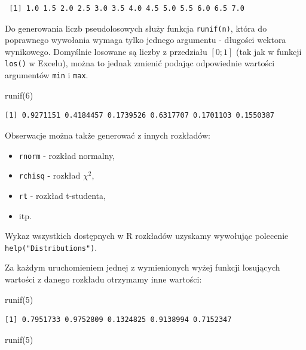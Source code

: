 \documentclass[
  letterpaper,
  DIV=11,
  numbers=noendperiod]{scrreprt}
\newenvironment{Shaded}{\begin{snugshade}}{\end{snugshade}}
\newcommand{\DecValTok}[1]{\textcolor[rgb]{0.68,0.00,0.00}{#1}}
\newcommand{\FunctionTok}[1]{\textcolor[rgb]{0.28,0.35,0.67}{#1}}
\newcommand{\NormalTok}[1]{\textcolor[rgb]{0.00,0.23,0.31}{#1}}
\providecommand{\tightlist}{%
  \setlength{\itemsep}{0pt}\setlength{\parskip}{0pt}}\usepackage{longtable,booktabs,array}
\begin{document}
\begin{verbatim}
 [1] 1.0 1.5 2.0 2.5 3.0 3.5 4.0 4.5 5.0 5.5 6.0 6.5 7.0
\end{verbatim}

Do generowania liczb pseudolosowych służy funkcja \texttt{runif(n)},
która do poprawnego wywołania wymaga tylko jednego argumentu - długości
wektora wynikowego. Domyślnie losowane są liczby z przedziału \([0;1]\)
(tak jak w funkcji \texttt{los()} w Excelu), można to jednak zmienić
podając odpowiednie wartości argumentów \texttt{min} i \texttt{max}.

\begin{Shaded}
\begin{Highlighting}[]
\FunctionTok{runif}\NormalTok{(}\DecValTok{6}\NormalTok{)}
\end{Highlighting}
\end{Shaded}

\begin{verbatim}
[1] 0.9271151 0.4184457 0.1739526 0.6317707 0.1701103 0.1550387
\end{verbatim}

Obserwacje można także generować z innych rozkładów:

\begin{itemize}
\tightlist
\item
  \texttt{rnorm} - rozkład normalny,
\item
  \texttt{rchisq} - rozkład \(\chi^2\),
\item
  \texttt{rt} - rozkład t-studenta,
\item
  itp.
\end{itemize}

Wykaz wszystkich dostępnych w R rozkładów uzyskamy wywołując polecenie
\texttt{help("Distributions")}.

Za każdym uruchomieniem jednej z wymienionych wyżej funkcji losujących
wartości z danego rozkładu otrzymamy inne wartości:

\begin{Shaded}
\begin{Highlighting}[]
\FunctionTok{runif}\NormalTok{(}\DecValTok{5}\NormalTok{)}
\end{Highlighting}
\end{Shaded}

\begin{verbatim}
[1] 0.7951733 0.9752809 0.1324825 0.9138994 0.7152347
\end{verbatim}

\begin{Shaded}
\begin{Highlighting}[]
\FunctionTok{runif}\NormalTok{(}\DecValTok{5}\NormalTok{)}
\end{Highlighting}
\end{Shaded}
\end{document}
